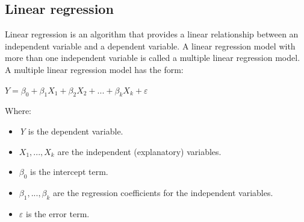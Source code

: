 \documentclass{ieeeojies}
\begin{document}
\subsection{Linear regression}
Linear regression is an algorithm that provides a linear relationship between an independent variable and a dependent variable. A linear regression model with more than one independent variable is called a multiple linear regression model. A multiple linear regression model has the form:
\newline  \centerline{$\textit{Y} = \beta_{0} + \beta_{1}X_{1} + \beta_{2}X_{2} + ... + \beta_{k}X_{k} + \varepsilon$}
\newline Where:
\begin{itemize}
	\item \textit{Y} is the dependent variable.
	\item $X_{1},...,X_{k}$ are the independent (explanatory) variables.
	\item $\beta_{0}$ is the intercept term.
	\item $\beta_{1},...,\beta_{k}$ are the regression coefficients for the independent variables.
	\item $\varepsilon$ is the error term.
\end{itemize}
\EOD
\end{document}
